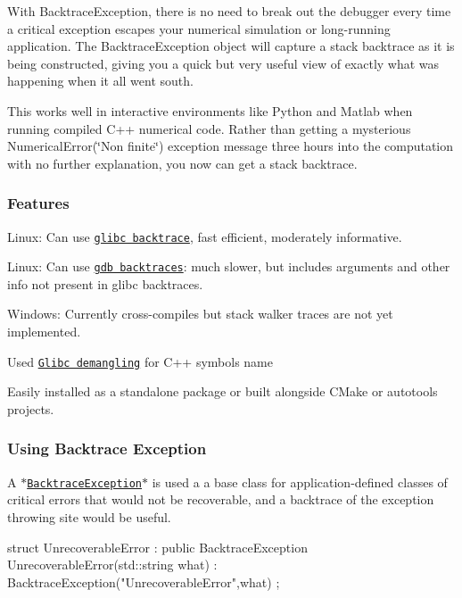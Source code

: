 With Backtrace\-Exception, there is no need to break out the debugger every time a critical exception escapes your numerical simulation or long-\/running application. The Backtrace\-Exception object will capture a stack backtrace as it is being constructed, giving you a quick but very useful view of exactly what was happening when it all went south.

This works well in interactive environments like Python and Matlab when running compiled C++ numerical code. Rather than getting a mysterious {\ttfamily Numerical\-Error(\char`\"{}\-Non finite\char`\"{})} exception message three hours into the computation with no further explanation, you now can get a stack backtrace.

\subsubsection*{Features}


\begin{DoxyItemize}
\item Linux\-: Can use \href{https://www.gnu.org/software/libc/manual/html_node/Backtraces.html}{\tt glibc backtrace}, fast efficient, moderately informative.
\item Linux\-: Can use \href{https://ftp.gnu.org/old-gnu/Manuals/gdb/html_node/gdb_42.html}{\tt gdb backtraces}\-: much slower, but includes arguments and other info not present in glibc backtraces.
\item Windows\-: Currently cross-\/compiles but stack walker traces are not yet implemented.
\item Used \href{https://gcc.gnu.org/onlinedocs/libstdc++/manual/ext_demangling.html}{\tt Glibc demangling} for C++ symbols name
\item Easily installed as a standalone package or built alongside C\-Make or autotools projects.
\end{DoxyItemize}

\subsubsection*{Using Backtrace Exception}

A \href{https://markjolah.github.io/BacktraceException/classbacktrace__exception_1_1BacktraceException.html}{\tt $\ast$\-Backtrace\-Exception$\ast$} is used a a base class for application-\/defined classes of critical errors that would not be recoverable, and a backtrace of the exception throwing site would be useful. \begin{DoxyVerb}struct UnrecoverableError : public BacktraceException {
    UnrecoverableError(std::string what) : BacktraceException("UnrecoverableError",what) {}
};
\end{DoxyVerb}



